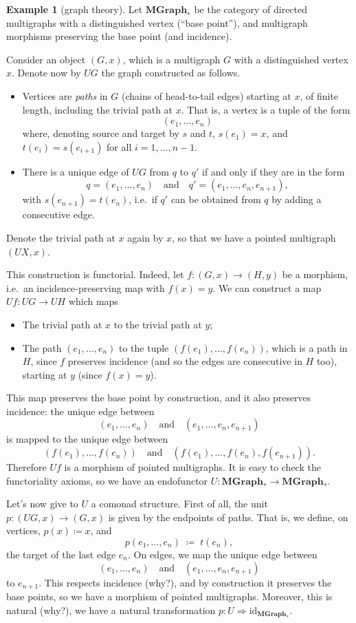 \documentclass[a4paper,11pt,oneside]{scrbook}
\numberwithin{equation}{section}
\theoremstyle{plain}
\theoremstyle{definition}
\newtheorem{eg}[thm]{Example}
\newcommand{\cat}[1]{{\mathbf{#1}}} %
\DeclareMathOperator{\1}{\mathbbm{1}}
\DeclareMathOperator{\2}{\mathbbm{2}}
\newcommand{\id}{\mathrm{id}} %
\begin{document}
\begin{eg}[graph theory]\label{ucgraphs}
 Let $\cat{MGraph}_*$ be the category of directed multigraphs with a distinguished vertex (``base point''), and multigraph morphisms preserving the base point (and incidence). 
 
 Consider an object $(G,x)$, which is a multigraph $G$ with a distinguished vertex $x$. Denote now by $UG$ the graph constructed as follows.
 \begin{itemize}
  \item Vertices are \emph{paths} in $G$ (chains of head-to-tail edges) starting at $x$, of finite length, including the trivial path at $x$. That is, a vertex is a tuple of the form
  $$
  (e_1,\dots,e_n)
  $$
  where, denoting source and target by $s$ and $t$, $s(e_1)=x$, and $t(e_i)=s(e_{i+1})$ for all $i=1,\dots,n-1$.
  \item There is a unique edge of $UG$ from $q$ to $q'$ if and only if they are in the form 
  $$
  q=(e_1,\dots,e_n) \quad\mbox{and}\quad q'=(e_1,\dots,e_n,e_{n+1}) ,
  $$
  with $s(e_{n+1})=t(e_n)$,
  i.e.~if $q'$ can be obtained from $q$ by adding a consecutive edge. 
 \end{itemize}
 Denote the trivial path at $x$ again by $x$, so that we have a pointed multigraph $(UX,x)$. 
 
 This construction is functorial. Indeed, let $f:(G,x)\to (H,y)$ be a morphism, i.e.~an incidence-preserving map with $f(x)=y$. We can construct a map $Uf:UG\to UH$ which maps 
 \begin{itemize}
  \item The trivial path at $x$ to the trivial path at $y$;
  \item The path $(e_1,\dots,e_n)$ to the tuple $(f(e_1),\dots,f(e_n))$, which is a path in $H$, since $f$ preserves incidence (and so the edges are consecutive in $H$ too), starting at $y$ (since $f(x)=y$). 
 \end{itemize}
 This map preserves the base point by construction, and it also preserves incidence: the unique edge between
 $$
 (e_1,\dots,e_n) \quad\mbox{and}\quad (e_1,\dots,e_n,e_{n+1})
 $$
 is mapped to the unique edge between
 $$
 (f(e_1),\dots,f(e_n)) \quad\mbox{and}\quad (f(e_1),\dots,f(e_n),f(e_{n+1})) .
 $$
 Therefore $Uf$ is a morphism of pointed multigraphs.
 It is easy to check the functoriality axioms, so we have an endofunctor $U:\cat{MGraph}_*\to\cat{MGraph}_*$. 

 Let's now give to $U$ a comonad structure. First of all, the unit $p:(UG,x)\to(G,x)$ is given by the endpoints of paths. That is, we define, on vertices, $p(x)\coloneqq x$, and
 $$
 p(e_1,\dots,e_n) \;\coloneqq\; t(e_n),
 $$
 the target of the last edge $e_n$. On edges, we map the unique edge between
 $$
 (e_1,\dots,e_n) \quad\mbox{and}\quad (e_1,\dots,e_n,e_{n+1})
 $$
 to $e_{n+1}$. This respects incidence (why?), and by construction it preserves the base points, so we have a morphism of pointed multigraphs. Moreover, this is natural (why?), we have a natural transformation $p:U\Rightarrow \id_{\cat{MGraph}_*}$. 
 

\end{eg}
\end{document}
